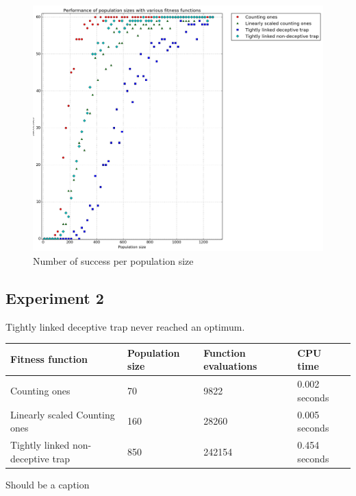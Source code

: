 \documentclass[12pt]{article}
\theoremstyle{definition}
\begin{document}
\begin{figure}[H]
    \centering
    \includegraphics[width=1\linewidth]{images/exp1.png}
    \caption{Number of success per population size}
\label{fig:exp1}
\end{figure}


\subsection*{Experiment 2}
Tightly linked deceptive trap never reached an optimum.

\begin{adjustwidth}{-1cm}{}
\begin{minipage}{\linewidth}
\centering
{}
\label{tab:title}
\begin{tabular}{llll}%
\toprule[1.5pt]
\bf Fitness function & \bf Population size & \bf Function evaluations & \bf CPU time\\\midrule
Counting ones & 70 & 9822 & 0.002 seconds \\
Linearly scaled Counting ones & 160 & 28260 & 0.005 seconds \\
Tightly linked non-deceptive trap & 850 & 242154 & 0.454 seconds \\
\bottomrule[1.25pt]
\end{tabular}\par
\bigskip
Should be a caption
\end{minipage}
\end{adjustwidth}
\end{document}
